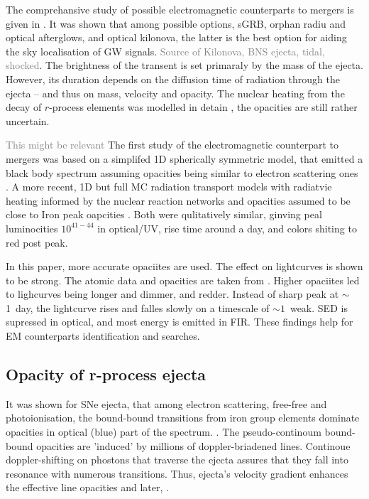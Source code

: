 \documentclass[11pt,a4paper,headinclude=true,DIV=14,BCOR=8mm,chapterprefix,listof=totoc,twoside,openright,abstracton]{scrbook}
\newcommand{\gray}[1]{\textcolor{gray}{#1}}
\begin{document}
The comprehansive study of possible electromagnetic counterparts to mergers is given in \cite{Metzger & Berger (2012)}. It was shown that among possible options, sGRB, orphan radiu and optical afterglows, and optical kilonova, the latter is the best option for aiding the sky localisation of GW signals. \gray{Source of Kilonova, BNS ejecta, tidal, shocked}.
The brightness of the transent is set primaraly by the mass of the ejecta. However, its duration depends on the diffusion time of radiation through the ejecta -- and thus on mass, velocity and opacity. 
The nuclear heating from the decay of $r$-process elements was modelled in detain \cite{(Metzger et al. 2010; Roberts et al. 2011; Goriely et al. 2011, [add Lippuner]}, the opacities are still rather uncertain. 

\gray{This might be relevant}
The first study of the electromagnetic counterpart to mergers was based on a simplifed 1D spherically symmetric model, that emitted a black body spectrum assuming opacities being similar to electron scattering ones \cite{Li & Paczynski (1998)}. A more recent, 1D but full MC radiation transport models with radiatvie heating informed by the nuclear reaction networks and opacities assumed to be close to Iron peak oapcities \cite{(Metzger et al. 2010; Roberts et al. 2011)}. Both were qulitatively similar, ginving peal luminocities $10^{41-44}$ in optical/UV, rise time around a day, and colors shiting to red post peak. 

In this paper, more accurate opaciites are used. The effect on lightcurves is shown to be strong. 
The atomic data and opacities are taken from \cite{Kasen et al. 2013}.
Higher opaciites led to lighcurves being longer and dimmer, and redder. Instead of sharp peak at $\sim$1~day, the lightcurve rises and falles slowly on a timescale of $\sim 1$~weak. SED is supressed in optical, and most energy is emitted in FIR. 
These findings help for EM counterparts identification and searches. 


\subsection{Opacity of r-process ejecta}

It was shown for SNe ejecta, that among electron scattering, free-free and photoionisation, the bound-bound transitions from iron group elements dominate opacities in optical (blue) part of the spectrum. \cite{(see e.g. Pinto & Eastman 2000)}. 
The pseudo-continoum bound-bound opacities are 'induced' by millions of doppler-briadened lines. Continoue doppler-shifting on phostons that traverse the ejecta assures that they fall into resonance with numerous transitions. Thus, ejecta's velocity gradient enhances the effective line opacities \cite{Karp et al. (1977)} and later, \cite{(Friend & Castor 1983; Eastman & Pinto 1993; Hoeflich et al. 1993).}. 
\end{document}
